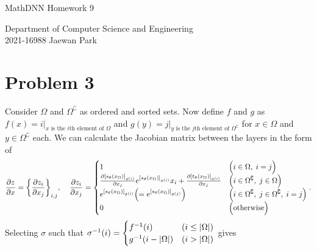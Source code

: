 \documentclass[10pt]{article}
\begin{document}
\begin{center}
    {\LARGE MathDNN Homework 9} \\
\end{center}
\begin{flushright}
    Department of Computer Science and Engineering \\
    2021-16988 Jaewan Park
\end{flushright}

\section*{Problem 3}
Consider $\Omega$ and $\Omega^\complement$ as ordered and sorted sets. 
Now define $f$ and $g$ as $f(x) = i|_{x\text{ is the }i\text{th element of }\Omega}$ and $g(y) = j|_{y\text{ is the }j\text{th element of }\Omega^\complement}$ for $x \in \Omega$ and $y \in \Omega^\complement$ each.
We can calculate the Jacobian matrix between the layers in the form of
\begin{equation*}
    \frac{\partial z}{\partial x} = \qty{\frac{\partial z_i}{\partial x_j}}_{i, j}, \;\;\;\;
    \frac{\partial z_i}{\partial x_j} = \begin{cases}
        1 & \Big(i \in \Omega, \; i = j\Big) \\
        \frac{\partial \qty[s_\theta(x_\Omega)]_{g(i)}}{\partial x_j}e^{\qty[s_\theta(x_\Omega)]_{g(i)}}x_i + \frac{\partial \qty[t_\theta(x_\Omega)]_{g(i)}}{\partial x_j} & \qty(i \in \Omega^\complement, \; j \in \Omega) \\
        e^{\qty[s_\theta(x_\Omega)]_{g(i)}} \qty(= e^{\qty[s_\theta(x_\Omega)]_{g(j)}}) & \qty(i \in \Omega^\complement, \; j \in \Omega^\complement, \; i = j) \\
        0 & \Big(\text{otherwise}\Big)
    \end{cases}.
\end{equation*}
Selecting $\sigma$ such that $\sigma^{-1}(i) = \begin{cases}
    f^{-1}(i) & (i \leq |\Omega|) \\
    g^{-1}\qty(i - |\Omega|) & (i > |\Omega|)
\end{cases}$ gives
\end{document}
